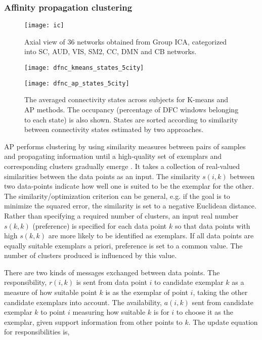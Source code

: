 \documentclass{article}
\begin{document}
\subsubsection{Affinity propagation clustering}
\label{sec:Affinity}

\begin{figure}
  \centering
  \centerline{\texttt{[image: ic]}}
  \caption{Axial view of $36$ networks obtained from Group \ac{ICA}, categorized into \acf{SC}, \acf{AUD}, \acf{VIS}, \acf{SM2}, \acf{CC}, \acf{DMN} and \acf{CB} networks.}
  \label{fig:IC}
\end{figure}

\begin{figure*}
  \centering
  \centerline{\texttt{[image: dfnc\_kmeans\_states\_5city]}}
  \centerline{\texttt{[image: dfnc\_ap\_states\_5city]}}
  \caption{The averaged connectivity states across subjects for K-means and \ac{AP} methods. The occupancy (percentage of \ac{DFC} windows belonging to each state) is also shown. States are sorted according to similarity between connectivity states estimated by two approaches.}
  \label{fig:states}
\end{figure*}

\ac{AP} performs clustering by using similarity measures between pairs of samples and propagating information until a high-quality set of exemplars and corresponding clusters gradually emerge \cite{frey_clustering_2007}. It takes a collection of real-valued similarities between the data points as an input. The similarity $s(i,k)$ between two data-points indicate how well one is suited to be the exemplar for the other. The similarity/optimization criterion can be general, e.g. if the goal is to minimize the squared error, the similarity is set to a negative Euclidean distance. Rather than specifying a required number of clusters, an input real number $s(k,k)$ (preference) is specified for each data point $k$ so that data points with high $s(k,k)$ are more likely to be identified as exemplars. If all data points are equally suitable exemplars a priori, preference is set to a common value. The number of clusters produced is influenced by this value.

There are two kinds of messages exchanged between data points. The responsibility, $r(i,k)$ is sent from data point $i$ to candidate exemplar $k$ as a measure of how suitable point $k$ is as the exemplar of point $i$, taking the other candidate exemplars into account. The availability, $a(i,k)$ sent from candidate exemplar $k$ to point $i$ measuring how suitable $k$ is for $i$ to choose it as the exemplar, given support information from other points to $k$. The update equation for responsibilities is,
\end{document}
